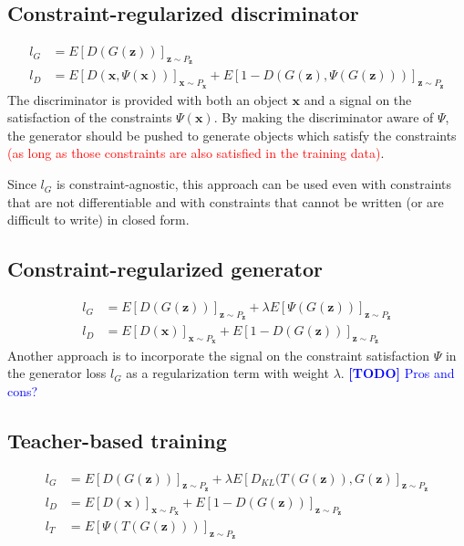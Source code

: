 \documentclass{article}
\newcommand{\todo}[1]{\textcolor{blue}{{\bf [TODO]} #1}}
\begin{document}
\subsection{Constraint-regularized discriminator}
\begin{align*}
  l_G &= E[D(G(\mathbf{z}))]_{\mathbf{z} \sim P_\mathbf{z}} \\
  l_D &= E[D(\mathbf{x},\Psi(\mathbf{x}))]_{\mathbf{x} \sim P_{\mathbf{x}}} + E[1 - D(G(\mathbf{z}),\Psi(G(\mathbf{z})))]_{\mathbf{z} \sim P_{\mathbf{z}}}
\end{align*}
The discriminator is provided with both an object $\mathbf{x}$ and a
signal on the satisfaction of the constraints $\Psi(\mathbf{x})$.  By
making the discriminator aware of $\Psi$, the generator should be
pushed to generate objects which satisfy the constraints \textcolor{red}{(as long as
  those constraints are also satisfied in the training data)}.

Since $l_G$ is constraint-agnostic, this approach can be used even
with constraints that are not differentiable and with constraints that
cannot be written (or are difficult to write) in closed form.

\subsection{Constraint-regularized generator}
\begin{align*}
  l_G &= E[D(G(\mathbf{z}))]_{\mathbf{z} \sim P_\mathbf{z}} + \lambda E[\Psi(G(\mathbf{z}))]_{\mathbf{z} \sim P_{\mathbf{z}}} \\
  l_D &= E[D(\mathbf{x})]_{\mathbf{x} \sim P_{\mathbf{x}}} + E[1 - D(G(\mathbf{z}))]_{\mathbf{z} \sim P_{\mathbf{z}}}
\end{align*}
Another approach is to incorporate the signal on the constraint
satisfaction $\Psi$ in the generator loss $l_G$ as a regularization
term with weight $\lambda$. \todo{Pros and cons?}


\subsection{Teacher-based training}
\begin{align*}
  l_G &= E[D(G(\mathbf{z}))]_{\mathbf{z} \sim P_\mathbf{z}} + \lambda E[D_{KL}(T(G(\mathbf{z})),G(\mathbf{z})]_{\mathbf{z} \sim P_{\mathbf{z}}} \\
  l_D &= E[D(\mathbf{x})]_{\mathbf{x} \sim P_{\mathbf{x}}} + E[1 - D(G(\mathbf{z}))]_{\mathbf{z} \sim P_{\mathbf{z}}}\\
  l_T &= E[\Psi(T(G(\mathbf{z})))]_{\mathbf{z} \sim P_{\mathbf{z}}}
\end{align*}  
\end{document}
